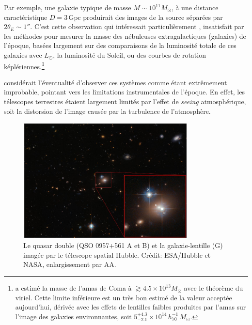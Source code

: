 Par exemple, une galaxie typique de masse $M\sim 10^{11} M_{\odot}$, à une distance caractéristique $D= 3 \, \mathrm{Gpc}$ produirait des 
images de la source séparées par $2 \theta_E \sim 1''$. C'est cette observation qui intéressait particulièrement 
\citet{Zwicky1937b}, insatisfait par les méthodes pour mesurer la masse des nébuleuses extragalactiques (galaxies) 
de l'époque, basées largement sur des comparaisons de la luminosité totale de ces galaxies avec $L_\odot$, la luminosité du Soleil, 
ou des courbes de rotation képlériennes.\footnote{
\citet{Zwicky1937b} a estimé la masse de l'amas de Coma à $\gtrsim 4.5\times  10^{13}M_\odot$ avec le théorème du viriel. 
Cette limite inférieure est un très bon estimé de 
la valeur acceptée aujourd'hui, dérivée avec les effets de lentilles faibles produites par l'amas 
sur l'image des galaxies environnantes, soit $5^{+4.3}_{-2.1} \times 10^{14}\, h^{-1}_{70}\,M_\odot$\citep{Gavazzi2009}.
} 

\citet{Einstein1936} considérait l'éventualité d'observer ces systèmes comme étant extrêmement 
improbable, pointant vers les limitations instrumentales de l'époque. En effet, les télescopes terrestres étaient 
largement limités par l'effet de \textit{seeing} atmosphérique, soit la distorsion de l'image causée par la turbulence de 
l'atmosphère.

\begin{figure}[tb!]
        \centering
        \includegraphics[width=0.8\textwidth]{figures/zoomed_in_qso0957}
        \caption{Le quasar double (QSO 0957+561 A et B) et la galaxie-lentille (G) imagée par le télescope spatial Hubble. 
        Crédit: ESA/Hubble et NASA, enlargissement par AA.}
        \label{fig:doubel quasar}
\end{figure}

